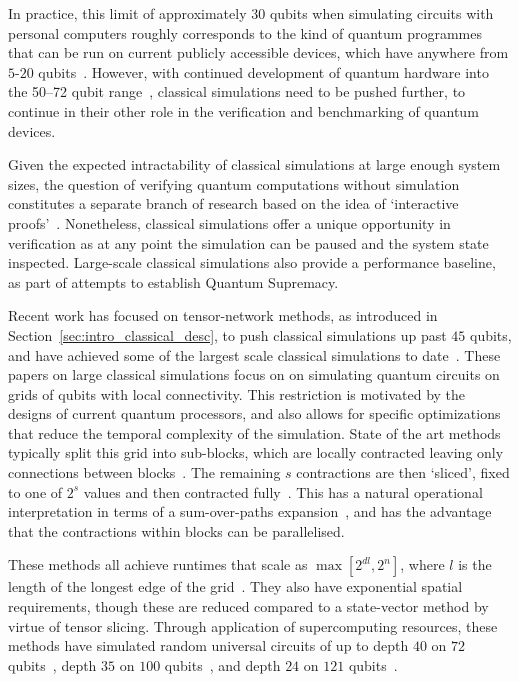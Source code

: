In practice, this limit of approximately $30$ qubits when simulating circuits with personal computers roughly corresponds to the kind of quantum programmes that can be run on current publicly accessible devices, which have anywhere from $5$-$20$ qubits~\cite{IBMQ,RigettiQPU}. However, with continued development of quantum hardware into the 50--72 qubit range~\cite{IBM50,GoogleBristlecone}, classical simulations need to be pushed further, to continue in their other role in the verification and benchmarking of quantum devices.\par
Given the expected intractability of classical simulations at large enough system sizes, the question of verifying quantum computations without simulation constitutes a separate branch of research based on the idea of `interactive proofs'~\cite{Aharonov2017,Mahadev2018}. Nonetheless, classical simulations offer a unique opportunity in verification as at any point the simulation can be paused and the system state inspected. Large-scale classical simulations also provide a performance baseline, as part of attempts to establish Quantum Supremacy.\par
Recent work has focused on tensor-network methods, as introduced in Section~\ref{sec:intro_classical_desc}, to push classical simulations up past $45$ qubits, and have achieved some of the largest scale classical simulations to date~\cite{Pendault2017,Chen2018,Chen2018b,Markov2018,Villalonga2019}. These papers on large classical simulations focus on on simulating quantum circuits on grids of qubits with local connectivity. This restriction is motivated by the designs of current quantum processors, and also allows for specific optimizations that reduce the temporal complexity of the simulation. State of the art methods typically split this grid into sub-blocks, which are locally contracted leaving only connections between blocks~\cite{Pendault2017,Chen2018b,Markov2018,Villalonga2018}. The remaining $s$ contractions are then `sliced', fixed to one of $2^{s}$ values and then contracted fully~\cite{Pendault2017}. This has a natural operational interpretation in terms of a sum-over-paths expansion~\cite{Markov2018}, and has the advantage that the contractions within blocks can be parallelised.\par
These methods all achieve runtimes that scale as $\max \left[ 2^{dl}, 2^{n}\right]$, where $l$ is the length of the longest edge of the grid~\cite{Markov2005}. They also have exponential spatial requirements, though these are reduced compared to a state-vector method by virtue of tensor slicing. Through application of supercomputing resources, these methods have simulated random universal circuits of up to depth $40$ on $72$ qubits~\cite{Villalonga2018}, depth $35$ on $100$ qubits~\cite{Chen2018}, and depth $24$ on $121$ qubits~\cite{Villalonga2019}.\par
